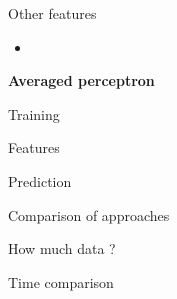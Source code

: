 \documentclass{beamer}
\begin{document}
\begin{frame}{Other features}

\begin{itemize}
  \item 

\end{itemize}

\end{frame}




\begin{frame}
\centering
{\LARGE {\bf Averaged perceptron} }
\end{frame}

\begin{frame}

\end{frame}

\begin{frame}{Training}


\end{frame}

\begin{frame}{Features}

\end{frame}

\begin{frame}{Prediction}

\end{frame}


\begin{frame}{Comparison of approaches}

\end{frame}



\begin{frame}{How much data ?}

\end{frame}

\begin{frame}{Time comparison}




\end{frame}
\end{document}
